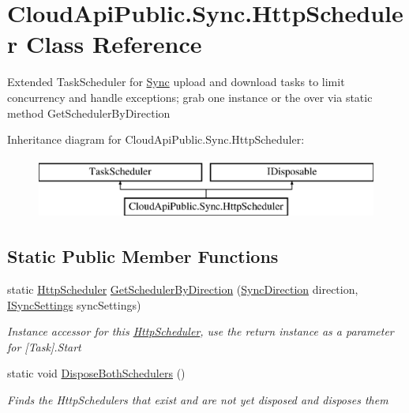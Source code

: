 \hypertarget{class_cloud_api_public_1_1_sync_1_1_http_scheduler}{\section{Cloud\-Api\-Public.\-Sync.\-Http\-Scheduler Class Reference}
\label{class_cloud_api_public_1_1_sync_1_1_http_scheduler}
}


Extended Task\-Scheduler for \hyperlink{namespace_cloud_api_public_1_1_sync}{Sync} upload and download tasks to limit concurrency and handle exceptions; grab one instance or the over via static method Get\-Scheduler\-By\-Direction  


Inheritance diagram for Cloud\-Api\-Public.\-Sync.\-Http\-Scheduler\-:\begin{figure}[H]
\begin{center}
\leavevmode
\includegraphics[height=2.000000cm]{class_cloud_api_public_1_1_sync_1_1_http_scheduler}
\end{center}
\end{figure}
\subsection*{Static Public Member Functions}
\begin{DoxyCompactItemize}
\item 
static \hyperlink{class_cloud_api_public_1_1_sync_1_1_http_scheduler}{Http\-Scheduler} \hyperlink{class_cloud_api_public_1_1_sync_1_1_http_scheduler_a7cf74c44d4599e5694487dbc6d21b2fc}{Get\-Scheduler\-By\-Direction} (\hyperlink{namespace_cloud_api_public_1_1_static_a8ba5d1f6d06fa058730616f021c8974f}{Sync\-Direction} direction, \hyperlink{interface_cloud_api_public_1_1_interfaces_1_1_i_sync_settings}{I\-Sync\-Settings} sync\-Settings)
\begin{DoxyCompactList}\small\item\em Instance accessor for this \hyperlink{class_cloud_api_public_1_1_sync_1_1_http_scheduler}{Http\-Scheduler}, use the return instance as a parameter for \mbox{[}Task\mbox{]}.Start \end{DoxyCompactList}\item 
static void \hyperlink{class_cloud_api_public_1_1_sync_1_1_http_scheduler_a5b654a57f79ca5b29982a697e017814e}{Dispose\-Both\-Schedulers} ()
\begin{DoxyCompactList}\small\item\em Finds the Http\-Schedulers that exist and are not yet disposed and disposes them \end{DoxyCompactList}\end{DoxyCompactItemize}
